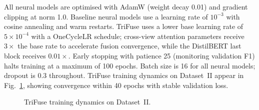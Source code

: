\documentclass[10pt,twocolumn,a4paper]{article}
\begin{document}
All neural models are optimised with AdamW \citep{ref25} (weight decay 0.01) and gradient clipping at norm 1.0. Baseline neural models use a learning rate of $10^{-3}$ with cosine annealing and warm restarts. TriFuse uses a lower base learning rate of $5{\times}10^{-4}$ with a OneCycleLR schedule; cross-view attention parameters receive $3\times$ the base rate to accelerate fusion convergence, while the DistilBERT last block receives $0.01\times$. Early stopping with patience 25 (monitoring validation F1) halts training at a maximum of 100 epochs. Batch size is 16 for all neural models; dropout is 0.3 throughout. TriFuse training dynamics on Dataset~II appear in Fig.~\ref{fig:training}, showing convergence within 40 epochs with stable validation loss.

\begin{figure}[!t]
\centering

\caption{TriFuse training dynamics on Dataset~II.}
\label{fig:training}
\end{figure}

\begin{table}[!t]
\caption{Experimental and parameter settings.}
\label{tab:hyperparams}
\centering
{}
\end{table}
\end{document}
